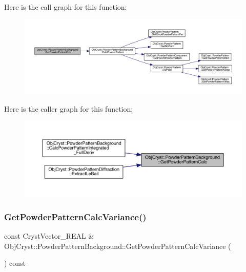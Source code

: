 Here is the call graph for this function\+:
\nopagebreak
\begin{figure}[H]
\begin{center}
\leavevmode
\includegraphics[width=350pt]{class_obj_cryst_1_1_powder_pattern_background_aeff3379aae4bd4ff3d6ff353ce8f7f96_cgraph}
\end{center}
\end{figure}
Here is the caller graph for this function\+:
\nopagebreak
\begin{figure}[H]
\begin{center}
\leavevmode
\includegraphics[width=350pt]{class_obj_cryst_1_1_powder_pattern_background_aeff3379aae4bd4ff3d6ff353ce8f7f96_icgraph}
\end{center}
\end{figure}
\mbox{\label{class_obj_cryst_1_1_powder_pattern_background_a75c931bd3e0370e7434f75d70ba51295}} 
\subsubsection{\texorpdfstring{GetPowderPatternCalcVariance()}{GetPowderPatternCalcVariance()}}
{\footnotesize\ttfamily const Cryst\+Vector\+\_\+\+R\+E\+AL \& Obj\+Cryst\+::\+Powder\+Pattern\+Background\+::\+Get\+Powder\+Pattern\+Calc\+Variance (\begin{DoxyParamCaption}{ }\end{DoxyParamCaption}) const\hspace{0.3cm}{\ttfamily [virtual]}}

